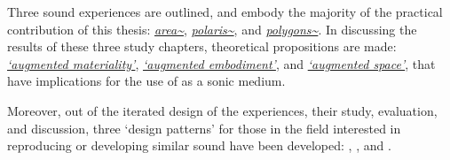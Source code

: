 \begin{SingleSpace}
    Three sound  experiences are outlined, and embody the majority of the practical contribution of this thesis: \textit{\hyperref[sec: area]{area\textasciitilde{}}}, \textit{\hyperref[sec: polaris]{polaris\textasciitilde{}}}, and \textit{\hyperref[sec: polygons]{polygons\textasciitilde{}}}. In discussing the results of these three study chapters, theoretical propositions are made: \textit{\hyperref[sec: discussion-medium-material]{`augmented materiality'}}, \textit{\hyperref[sec: discussion-medium-embodiment]{`augmented embodiment'}}, and \textit{\hyperref[sec: discussion-medium-space]{`augmented space'}}, that have implications for the use of  as a sonic medium.
    
    Moreover, out of the iterated design of the  experiences, their study, evaluation, and discussion, three `design patterns' for those in the field interested in reproducing or developing similar sound  have been developed: \textit{\hyperref[sec: discussion-patterns-experience]{}}, \textit{\hyperref[sec: discussion-patterns-instrument]{}}, and \textit{\hyperref[sec: discussion-patterns-environment]{}}.   
\end{SingleSpace}
\glsresetall